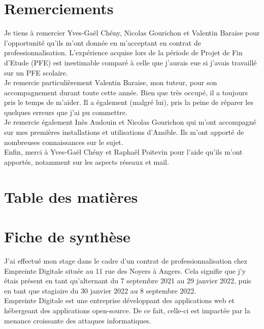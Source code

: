 \documentclass[12pt, a4paper, twoside]{article}
\begin{document}
\newpage
\section*{Remerciements}
Je tiens à remercier Yves-Gaël Chény, Nicolas Gourichon et Valentin Baraise pour l'opportunité qu'ils m'ont donnée en m'acceptant en contrat de professionnalisation. 
L'expérience acquise lors de la période de Projet de Fin d'Etude (\gls{PFE}) est inestimable comparé à celle que j'aurais eue si j'avais travaillé sur un \gls{PFE} scolaire. \\

Je remercie particulièrement Valentin Baraise, mon tuteur, pour son accompagnement durant toute cette année. 
Bien que très occupé, il a toujours pris le temps de m'aider. 
Il a également (malgré lui), pris la peine de réparer les quelques erreurs que j'ai pu commettre. \\

Je remercie également Inès Audouin et Nicolas Gourichon qui m'ont accompagné sur mes premières installations et utilisations d'\gls{Ansible}. 
Ils m'ont apporté de nombreuses connaissances sur le sujet. \\

Enfin, merci à Yves-Gaël Chény et Raphaël Poitevin pour l'aide qu'ils m'ont apportés, notamment sur les aspects réseaux et mail.


\newpage
\section*{Table des matières}
\tableofcontents

\newpage
\section*{Fiche de synthèse}
J'ai effectué mon stage dans le cadre d'un contrat de professionnalisation chez Empreinte Digitale située au 11 rue des Noyers à Angers.
Cela signifie que j'y étais présent en tant qu'alternant du 7 septembre 2021 au 29 janvier 2022, puis en tant que stagiaire du 30 janvier 2022 au 8 septembre 2022. \\

Empreinte Digitale est une entreprise développant des applications web et hébergeant des applications open-source.
De ce fait, celle-ci est impactée par la menance croissante des attaques informatiques.\\
\end{document}

